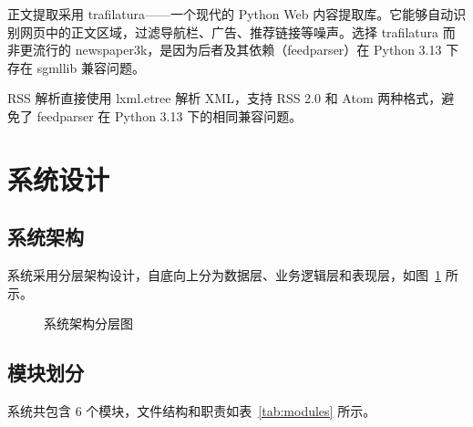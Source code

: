 \documentclass[12pt,a4paper]{ctexart}
\begin{document}
正文提取采用 trafilatura\cite{trafilatura}——一个现代的 Python Web 内容提取库。它能够自动识别网页中的正文区域，过滤导航栏、广告、推荐链接等噪声。选择 trafilatura 而非更流行的 newspaper3k，是因为后者及其依赖（feedparser）在 Python 3.13 下存在 sgmllib 兼容问题。

RSS 解析直接使用 lxml.etree 解析 XML，支持 RSS 2.0 和 Atom 两种格式，避免了 feedparser 在 Python 3.13 下的相同兼容问题。

\section{系统设计}

\subsection{系统架构}

系统采用分层架构设计，自底向上分为数据层、业务逻辑层和表现层，如图~\ref{fig:architecture} 所示。

\begin{figure}[H]
\centering
{}
\caption{系统架构分层图}
\label{fig:architecture}
\end{figure}

\subsection{模块划分}

系统共包含 6 个模块，文件结构和职责如表~\ref{tab:modules} 所示。
\end{document}
